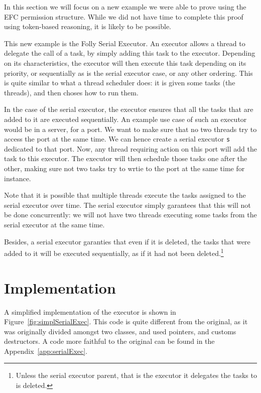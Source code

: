 In this section we will focus on a new example we were able to prove using the EFC permission structure. While we did not have time to complete this proof using token-based reasoning, it is likely to be possible.

This new example is the Folly Serial Executor. An executor allows a thread to delegate the call of a task, by simply adding this task to the executor. Depending on its characteristics, the executor will then execute this task depending on its priority, or sequentially as is the serial executor case, or any other ordering. This is quite similar to what a thread scheduler does: it is given some tasks (the threads), and then choses how to run them.

In the case of the serial executor, the executor ensures that all the tasks that are added to it are executed sequentially. An example use case of such an executor would be in a server, for a port. We want to make sure that no two threads try to access the port at the same time. We can hence create a serial executor \texttt{s} dedicated to that port. Now, any thread requiring action on this port will add the task to this executor. The executor will then schedule those tasks one after the other, making sure not two tasks try to wrtie to the port at the same time for instance.

Note that it is possible that multiple threads execute the tasks assigned to the serial executor over time. The serial executor simply garantees that this will not be done concurrently: we will not have two threads executing some tasks from the serial executor at the same time.

Besides, a serial executor garanties that even if it is deleted, the tasks that were added to it will be executed sequentially, as if it had not been deleted.\footnote{Unless the serial executor parent, that is the executor it delegates the tasks to is deleted.}



\section{Implementation}
A simplified implementation of the executor is shown in Figure~\ref{fig:simplSerialExec}. This code is quite different from the original, as it was originally divided amongst two classes, and used pointers, and customs destructors. A code more faithful to the original can be found in the Appendix~\ref{app:serialExec}. 

